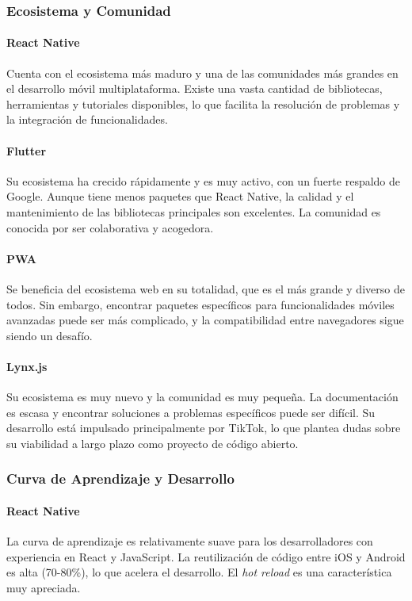 \subsubsection{Ecosistema y Comunidad}

\paragraph{React Native}
Cuenta con el ecosistema más maduro y una de las comunidades más grandes en el desarrollo móvil multiplataforma. Existe una vasta cantidad de bibliotecas, herramientas y tutoriales disponibles, lo que facilita la resolución de problemas y la integración de funcionalidades.

\paragraph{Flutter}
Su ecosistema ha crecido rápidamente y es muy activo, con un fuerte respaldo de Google. Aunque tiene menos paquetes que React Native, la calidad y el mantenimiento de las bibliotecas principales son excelentes. La comunidad es conocida por ser colaborativa y acogedora.

\paragraph{PWA}
Se beneficia del ecosistema web en su totalidad, que es el más grande y diverso de todos. Sin embargo, encontrar paquetes específicos para funcionalidades móviles avanzadas puede ser más complicado, y la compatibilidad entre navegadores sigue siendo un desafío.

\paragraph{Lynx.js}
Su ecosistema es muy nuevo y la comunidad es muy pequeña. La documentación es escasa y encontrar soluciones a problemas específicos puede ser difícil. Su desarrollo está impulsado principalmente por TikTok, lo que plantea dudas sobre su viabilidad a largo plazo como proyecto de código abierto.

\subsubsection{Curva de Aprendizaje y Desarrollo}

\paragraph{React Native}
La curva de aprendizaje es relativamente suave para los desarrolladores con experiencia en React y JavaScript. La reutilización de código entre iOS y Android es alta (70-80\%), lo que acelera el desarrollo. El \textit{hot reload} es una característica muy apreciada.

